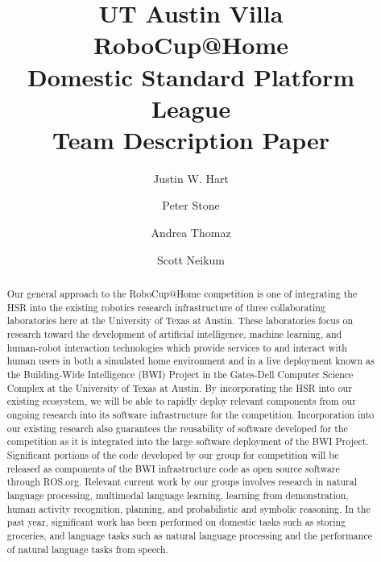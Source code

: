 \documentclass[runningheads,a4paper]{llncs}
\begin{document}
\title{UT Austin Villa\\ RoboCup@Home\\ Domestic Standard Platform League \\Team Description Paper}

\author{Justin W. Hart\and Peter Stone\and Andrea Thomaz\and Scott Neikum}
\maketitle



\begin{abstract}
Our general approach to the RoboCup@Home competition is one of integrating the HSR into the existing robotics research infrastructure of three collaborating laboratories here at the University of Texas at Austin. These laboratories focus on research toward the development of artificial intelligence, machine learning, and human-robot interaction technologies which provide services to and interact with human users in both a simulated home environment and in a live deployment known as the Building-Wide Intelligence (BWI) Project in the Gates-Dell Computer Science Complex at the University of Texas at Austin. By incorporating the HSR into our existing ecosystem, we will be able to rapidly deploy relevant components from our ongoing research into its software infrastructure for the competition. Incorporation into our existing research also guarantees the reusability of software developed for the competition as it is integrated into the large software deployment of the BWI Project. Significant portions of the code developed by our group for competition will be released as components of the BWI infrastructure code as open source software through ROS.org. Relevant current work by our groups involves research in natural language processing, multimodal language learning, learning from demonstration, human activity recognition, planning, and probabilistic and symbolic reasoning. In the past year, significant work has been performed on domestic tasks such as storing groceries, and language tasks such as natural language processing and the performance of natural language tasks from speech.


\end{abstract}
\end{document}
